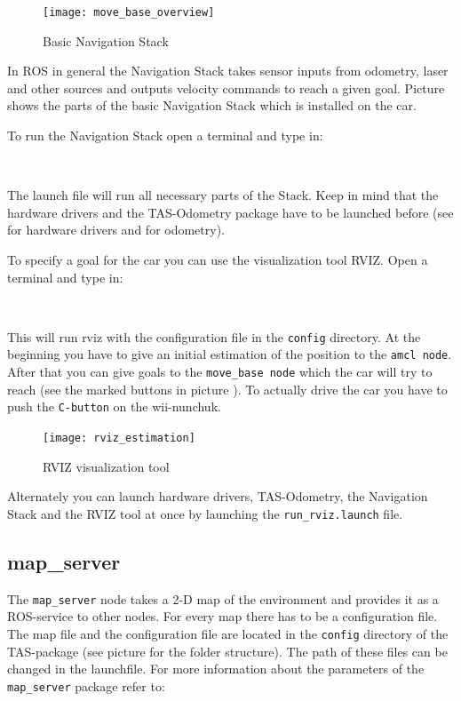 {\begin{figure}[h]
	\centering
		\texttt{[image: move\_base\_overview]}
	\caption{Basic Navigation Stack}
	\label{fig:move_base_overview}
\end{figure}

In ROS in general the Navigation Stack takes sensor inputs from odometry, laser and other sources and outputs velocity commands to reach a given goal. Picture  shows the parts of the basic Navigation Stack which is installed on the car.

To run the Navigation Stack open a terminal and type in:

\\

The launch file will run all necessary parts of the Stack. Keep in mind that the hardware drivers and the TAS-Odometry package have to be launched before (see  for hardware drivers and  for odometry).

To specify a goal for the car you can use the visualization tool RVIZ. Open a terminal and type in:

 \\

This will run rviz with the configuration file in the \texttt{config} directory. At the beginning you have to give an initial estimation of the position to the \texttt{amcl node}. After that you can give goals to the \texttt{move\_base node} which the car will try to reach (see the marked buttons in picture ). To actually drive the car you have to push the \texttt{C-button} on the wii-nunchuk. 

\begin{figure}[h]
	\centering
		\texttt{[image: rviz\_estimation]}
	\caption{RVIZ visualization tool}
	\label{fig:rviz_estimation}
\end{figure}


Alternately you can launch hardware drivers, TAS-Odometry, the Navigation Stack and the RVIZ tool at once by launching the \texttt{run\_rviz.launch} file.

\subsection{map\_server}
\label{sec:tas_package_map_server}
The \texttt{map\_server} node takes a 2-D map of the environment and provides it as a ROS-service to other nodes. For every map there has to be a configuration file. The map file and the configuration file are located in the \texttt{config} directory of the TAS-package (see picture  for the folder structure). The path of these files can be changed in the launchfile. For more information about the parameters of the \texttt{map\_server} package refer to:

}
